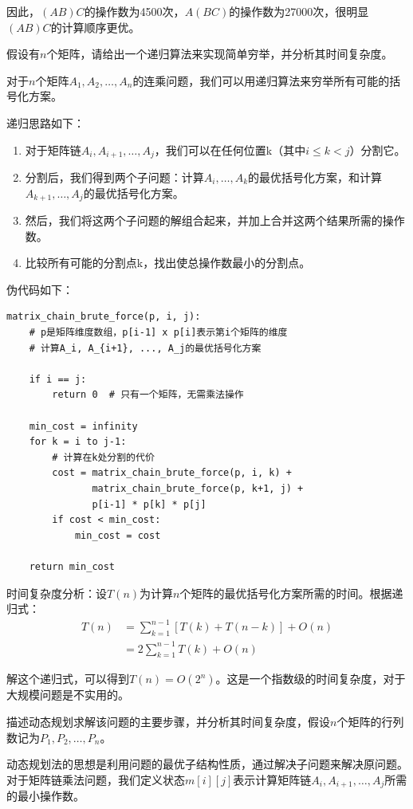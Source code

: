 \documentclass[12pt,twoside]{article}
\begin{document}
\begin{problems}
因此，$(AB)C$的操作数为4500次，$A(BC)$的操作数为27000次，很明显$(AB)C$的计算顺序更优。

\ppart 假设有$n$个矩阵，请给出一个递归算法来实现简单穷举，并分析其时间复杂度。

对于$n$个矩阵$A_1, A_2, \ldots, A_n$的连乘问题，我们可以用递归算法来穷举所有可能的括号化方案。

递归思路如下：
\begin{enumerate}
    \item 对于矩阵链$A_i, A_{i+1}, \ldots, A_j$，我们可以在任何位置k（其中$i \leq k < j$）分割它。
    \item 分割后，我们得到两个子问题：计算$A_i, \ldots, A_k$的最优括号化方案，和计算$A_{k+1}, \ldots, A_j$的最优括号化方案。
    \item 然后，我们将这两个子问题的解组合起来，并加上合并这两个结果所需的操作数。
    \item 比较所有可能的分割点k，找出使总操作数最小的分割点。
\end{enumerate}

伪代码如下：
\begin{verbatim}
matrix_chain_brute_force(p, i, j):
    # p是矩阵维度数组，p[i-1] x p[i]表示第i个矩阵的维度
    # 计算A_i, A_{i+1}, ..., A_j的最优括号化方案
    
    if i == j:
        return 0  # 只有一个矩阵，无需乘法操作
    
    min_cost = infinity
    for k = i to j-1:
        # 计算在k处分割的代价
        cost = matrix_chain_brute_force(p, i, k) + 
               matrix_chain_brute_force(p, k+1, j) + 
               p[i-1] * p[k] * p[j]
        if cost < min_cost:
            min_cost = cost
    
    return min_cost
\end{verbatim}

时间复杂度分析：设$T(n)$为计算$n$个矩阵的最优括号化方案所需的时间。根据递归式：
\begin{align}
T(n) &= \sum_{k=1}^{n-1} [T(k) + T(n-k)] + O(n) \\
&= 2\sum_{k=1}^{n-1} T(k) + O(n)
\end{align}

解这个递归式，可以得到$T(n) = O(2^n)$。这是一个指数级的时间复杂度，对于大规模问题是不实用的。

\ppart 描述动态规划求解该问题的主要步骤，并分析其时间复杂度，假设$n$个矩阵的行列数记为$P_1,P_2,\ldots,P_n$。

动态规划法的思想是利用问题的最优子结构性质，通过解决子问题来解决原问题。对于矩阵链乘法问题，我们定义状态$m[i][j]$表示计算矩阵链$A_i, A_{i+1}, \ldots, A_j$所需的最小操作数。


\end{problems}
\end{document}

